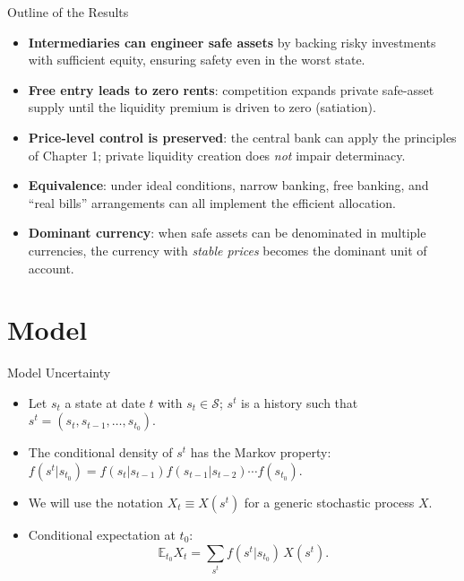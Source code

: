 \documentclass[11pt,aspectratio=169]{beamer}
\newcommand{\E}{\mathbb{E}}
\begin{document}
\begin{frame}{Outline of the Results}
\small
\begin{itemize}

  \item \textbf{Intermediaries can engineer safe assets} by backing risky investments with sufficient equity, ensuring safety even in the worst state.

  \vspace{0.6em}

  \item \textbf{Free entry leads to zero rents}: competition expands private safe-asset supply until the liquidity premium is driven to zero (satiation).

  \vspace{0.6em}

  \item \textbf{Price-level control is preserved}: the central bank can apply the principles of Chapter 1; private liquidity creation does \emph{not} impair determinacy.

  \vspace{0.6em}

  \item \textbf{Equivalence}: under ideal conditions, narrow banking, free banking, and “real bills” arrangements can all implement the efficient allocation.

  \vspace{0.6em}

  \item \textbf{Dominant currency}: when safe assets can be denominated in multiple currencies, the currency with \emph{stable prices} becomes the dominant unit of account.

\end{itemize}
\end{frame}

\section{Model}
\begin{frame}{Model Uncertainty}
\begin{itemize}
  \item Let $s_t$ a state at date $t$ with $s_t\in\mathcal{S}$; $s^t$ is a history such that $s^t=(s_t,s_{t-1},\dots,s_{t_0})$.
  \vspace{0.5em}
  \item The conditional density of $s^t$ has the Markov property: $f(s^t|s_{t_0})=f(s_t|s_{t-1})f(s_{t-1}|s_{t-2})\cdots f(s_{t_0})$.
  \vspace{0.5em}
  \item We will use the notation $X_t\equiv X(s^t)$ for a generic stochastic process $X$.
  \vspace{0.5em}
  
  \item Conditional expectation at $t_0$:
  \[ \E_{t_0} X_t=\sum_{s^t} f(s^t|s_{t_0})\,X(s^t). \]
\end{itemize}
\end{frame}
\end{document}
